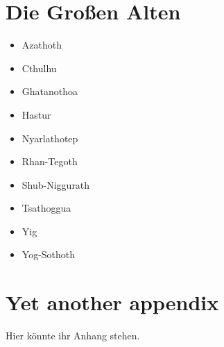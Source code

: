 \begin{appendices}

\chapter{Die Großen Alten}

\begin{itemize}
\item Azathoth
\item Cthulhu
\item Ghatanothoa
\item Hastur
\item Nyarlathotep
\item Rhan-Tegoth
\item Shub-Niggurath
\item Tsathoggua
\item Yig
\item Yog-Sothoth
\end{itemize}

\chapter{Yet another appendix}

Hier könnte ihr Anhang stehen.

\end{appendices}
